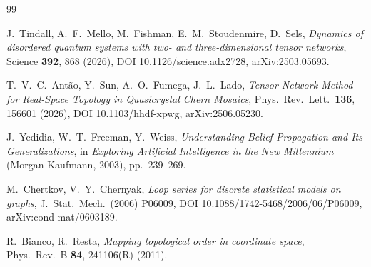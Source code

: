 \documentclass[aps,prx,reprint,nofootinbib,floatfix]{revtex4-2}
\begin{document}
\begin{thebibliography}{99}

J.~Tindall, A.~F.~Mello, M.~Fishman, E.~M.~Stoudenmire, D.~Sels,
\emph{Dynamics of disordered quantum systems with two- and
three-dimensional tensor networks},
Science \textbf{392}, 868 (2026),
DOI 10.1126/science.adx2728, arXiv:2503.05693.

T.~V.~C.~Antão, Y.~Sun, A.~O.~Fumega, J.~L.~Lado,
\emph{Tensor Network Method for Real-Space Topology in Quasicrystal
Chern Mosaics},
Phys.\ Rev.\ Lett.\ \textbf{136}, 156601 (2026),
DOI 10.1103/hhdf-xpwg, arXiv:2506.05230.

J.~Yedidia, W.~T.~Freeman, Y.~Weiss,
\emph{Understanding Belief Propagation and Its Generalizations},
in \textit{Exploring Artificial Intelligence in the New Millennium}
(Morgan Kaufmann, 2003), pp.~239--269.

M.~Chertkov, V.~Y.~Chernyak,
\emph{Loop series for discrete statistical models on graphs},
J.\ Stat.\ Mech.\ (2006) P06009,
DOI 10.1088/1742-5468/2006/06/P06009, arXiv:cond-mat/0603189.

R.~Bianco, R.~Resta,
\emph{Mapping topological order in coordinate space},
Phys.\ Rev.\ B \textbf{84}, 241106(R) (2011).

\end{thebibliography}
\end{document}
